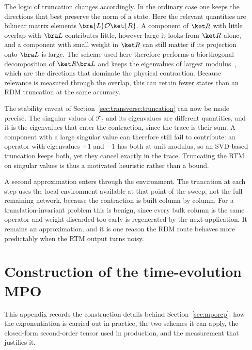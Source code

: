 The logic of truncation changes accordingly. In the ordinary case one keeps the directions that best preserve the norm of a state. Here the relevant quantities are bilinear matrix elements $\bra{L}\mathcal O\ket{R}$. A component of $\ket R$ with little overlap with $\bra L$ contributes little, however large it looks from $\ket R$ alone, and a component with small weight in $\ket R$ can still matter if its projection onto $\bra L$ is large. The scheme used here therefore performs a biorthogonal decomposition of $\ket R\bra L$ and keeps the eigenvalues of largest modulus~\cite{carignano_marimon_tagliacozzo2024}, which are the directions that dominate the physical contraction. Because relevance is measured through the overlap, this can retain fewer states than an RDM truncation at the same accuracy.

The stability caveat of Section~\ref{sec:transverse:truncation} can now be made precise. The singular values of $\mathcal{T}_t$ and its eigenvalues are different quantities, and it is the eigenvalues that enter the contraction, since the trace is their sum. A component with a large singular value can therefore still fail to contribute: an operator with eigenvalues $+1$ and $-1$ has both at unit modulus, so an SVD-based truncation keeps both, yet they cancel exactly in the trace. Truncating the RTM on singular values is thus a motivated heuristic rather than a bound.

A second approximation enters through the environment. The truncation at each step uses the local environment available at that point of the sweep, not the full remaining network, because the contraction is built column by column. For a translation-invariant problem this is benign, since every bulk column is the same operator and weight discarded too early is regenerated by the next application. It remains an approximation, and it is one reason the RDM route behaves more predictably when the RTM output turns noisy.




\FloatBarrier
\section{Construction of the time-evolution MPO}
\label{app:mpo}

This appendix records the construction details behind Section~\ref{sec:mporep}: how the exponentiation is carried out in practice, the two schemes it can apply, the closed-form second-order tensor used in production, and the measurement that justifies it.

